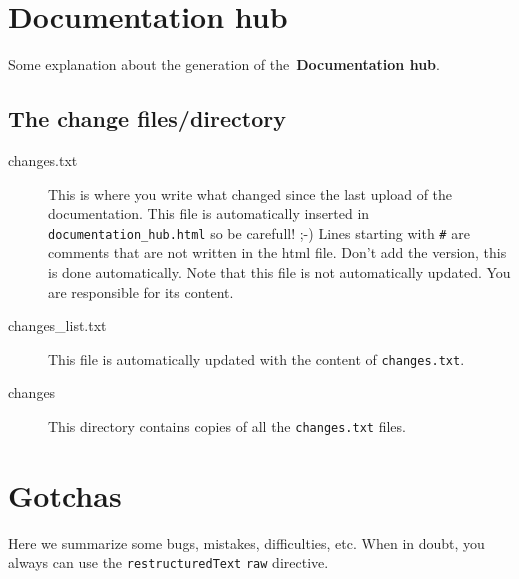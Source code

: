 \documentclass[a4paper,10pt]{article}
\newcommand{\code}[1]{\texttt{#1}}
\newcommand{\dhub}{{\bf Documentation hub}}
\begin{document}
\section{\dhub}

Some explanation about the generation of the~\dhub.
\subsection{The change files/directory}

\begin{description}
 \item[changes.txt] This is where you write what changed since the last upload of the documentation. This file is automatically inserted in \verb+documentation_hub.html+ so be carefull! ;-) Lines starting with \verb+#+ are comments that are not written in the html file. Don't add the version, this is done automatically. Note that this file is not automatically updated. You are responsible for its content.
 \item[changes\_list.txt] This file is automatically updated with the content of \verb+changes.txt+.
 \item[changes] This directory contains copies of all the \verb+changes.txt+ files.
 \end{description}




\section{Gotchas}

Here we summarize some bugs, mistakes, difficulties, etc. When in doubt, you always can use the \code{restructuredText}
\code{raw} directive.
\end{document}
